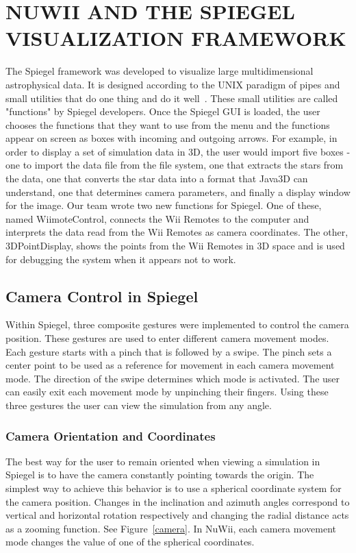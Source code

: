 \documentclass[a4paper,twoside]{article}
\begin{document}
\section{\uppercase{NuWii and the Spiegel Visualization Framework}}
The Spiegel framework was developed to visualize large multidimensional
astrophysical data. It is designed according to the UNIX paradigm of pipes and
small utilities that do one thing and do it well~\cite{Bischof06}. These small
utilities are called "functions" by Spiegel developers. Once the Spiegel GUI is
loaded, the user chooses the functions that they want to use from the menu and
the functions appear on screen as boxes with incoming and outgoing arrows. For
example, in order to display a set of simulation data in 3D, the user would
import five boxes - one to import the data file from the file system, one that
extracts the stars from the data, one that converts the star data into a format
that Java3D can understand, one that determines camera parameters, and finally
a display window for the image. Our team wrote two new functions for Spiegel.
One of these, named WiimoteControl, connects the Wii Remotes to the computer
and interprets the data read from the Wii Remotes as camera coordinates. The
other, 3DPointDisplay, shows the points from the Wii Remotes in 3D space and is
used for debugging the system when it appears not to work.

 
\subsection{Camera Control in Spiegel} Within Spiegel, three composite gestures
were implemented to control the camera position. These gestures are used to
enter different camera movement modes.  Each gesture starts with a pinch that
is followed by a swipe. The pinch sets a center point to be used as a reference
for movement in each camera movement mode. The direction of the swipe
determines which mode is activated. The user can easily exit each movement mode
by unpinching their fingers. Using these three gestures the user can view the
simulation from any angle.

\subsubsection{Camera Orientation and Coordinates} The best way for the user to
remain oriented when viewing a simulation in Spiegel is to have the camera
constantly pointing towards the origin. The simplest way to achieve this
behavior is to use a spherical coordinate system for the camera position.
Changes in the inclination and azimuth angles correspond to vertical and
horizontal rotation respectively and changing the radial distance acts as a
zooming function. See Figure~\ref{camera}. In NuWii, each camera movement mode
changes the value of one of the spherical coordinates.
\end{document}
